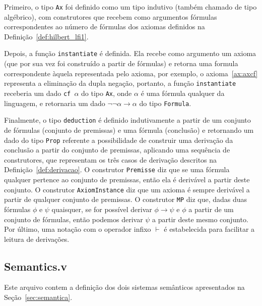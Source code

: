       Primeiro, o tipo \texttt{Ax} foi definido como um tipo indutivo (também chamado de tipo algébrico), com construtores que recebem como argumentos fórmulas correspondentes ao número de fórmulas dos axiomas definidos na Definição~\ref{def:hilbert_lfi1}. 
      
      Depois, a função \texttt{instantiate} é definida. Ela recebe como argumento um axioma (que por sua vez foi construído a partir de fórmulas) e retorna uma formula correspondente àquela representada pelo axioma, por exemplo, o axioma~\ref{ax:axcf} representa a eliminação da dupla negação, portanto, a função \texttt{instantiate} receberia um dado \texttt{cf $\alpha$} do tipo \texttt{Ax}, onde $\alpha$ é uma fórmula qualquer da linguagem, e retornaria um dado $\neg\neg\alpha \to \alpha$ do tipo \texttt{Formula}.

      Finalmente, o tipo \texttt{deduction} é definido indutivamente a partir de um conjunto de fórmulas (conjunto de premissas) e uma fórmula (conclusão) e retornando um dado do tipo \texttt{Prop} referente a possibilidade de construir uma derivação da conclusão a partir do conjunto de premissas, aplicando uma sequência de construtores, que representam os três casos de derivação descritos na Definição~\ref{def:derivacao}. O construtor \texttt{Premisse} diz que se uma fórmula qualquer pertence ao conjunto de premissas, então ela é derivável a partir deste conjunto. O construtor \texttt{AxiomInstance} diz que um axioma é sempre derivável a partir de qualquer conjunto de premissas. O construtor \texttt{MP} diz que, dadas duas fórmulas $\phi$ e $\psi$ quaisquer, se for possível derivar $\phi \to \psi$ e $\phi$ a partir de um conjunto de fórmulas, então podemos derivar $\psi$ a partir deste mesmo conjunto. Por último, uma notação com o operador infixo $\vdash$ é estabelecida para facilitar a leitura de derivações.
    
    \subsection{Semantics.v}

      Este arquivo contem a definição dos dois sistemas semânticos apresentados na Seção~\ref{sec:semantica}.

